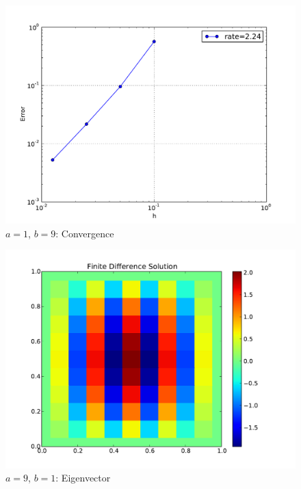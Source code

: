 \documentclass[10pt,letterpaper]{article}
\begin{document}
\begin{figure}[p]
\begin{center}
\includegraphics[width=5in,keepaspectratio]{be19.pdf}
\end{center}
\caption{$a=1$, $b=9$: Convergence}
\end{figure}

\begin{figure}[p]
\begin{center}
\includegraphics[width=5in,keepaspectratio]{b91.pdf}
\end{center}
\caption{$a=9$, $b=1$: Eigenvector}
\end{figure}
\end{document}

